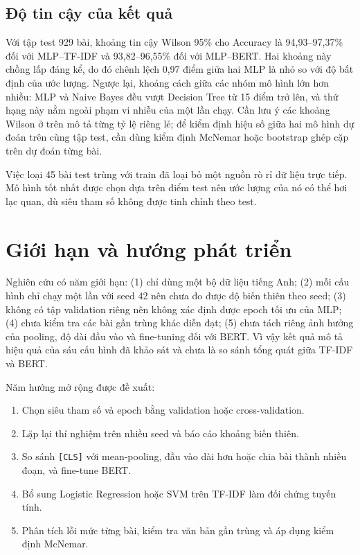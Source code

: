 \documentclass[conference,a4paper]{IEEEtran}
\begin{document}
\subsection{Độ tin cậy của kết quả}

Với tập test 929 bài, khoảng tin cậy Wilson 95\% cho Accuracy là 94,93--97,37\% đối với MLP--TF-IDF và 93,82--96,55\% đối với MLP--BERT. Hai khoảng này chồng lấp đáng kể, do đó chênh lệch 0,97 điểm giữa hai MLP là nhỏ so với độ bất định của ước lượng. Ngược lại, khoảng cách giữa các nhóm mô hình lớn hơn nhiều: MLP và Naive Bayes đều vượt Decision Tree từ 15 điểm trở lên, và thứ hạng này nằm ngoài phạm vi nhiễu của một lần chạy. Cần lưu ý các khoảng Wilson ở trên mô tả từng tỷ lệ riêng lẻ; để kiểm định hiệu số giữa hai mô hình dự đoán trên cùng tập test, cần dùng kiểm định McNemar hoặc bootstrap ghép cặp trên dự đoán từng bài.

Việc loại 45 bài test trùng với train đã loại bỏ một nguồn rò rỉ dữ liệu trực tiếp. Mô hình tốt nhất được chọn dựa trên điểm test nên ước lượng của nó có thể hơi lạc quan, dù siêu tham số không được tinh chỉnh theo test.

\section{Giới hạn và hướng phát triển}

Nghiên cứu có năm giới hạn: (1) chỉ dùng một bộ dữ liệu tiếng Anh; (2) mỗi cấu hình chỉ chạy một lần với seed 42 nên chưa đo được độ biến thiên theo seed; (3) không có tập validation riêng nên không xác định được epoch tối ưu của MLP; (4) chưa kiểm tra các bài gần trùng khác diễn đạt; (5) chưa tách riêng ảnh hưởng của pooling, độ dài đầu vào và fine-tuning đối với BERT. Vì vậy kết quả mô tả hiệu quả của sáu cấu hình đã khảo sát và chưa là so sánh tổng quát giữa TF-IDF và BERT.

Năm hướng mở rộng được đề xuất:
\begin{enumerate}[leftmargin=*]
    \item Chọn siêu tham số và epoch bằng validation hoặc cross-validation.
    \item Lặp lại thí nghiệm trên nhiều seed và báo cáo khoảng biến thiên.
    \item So sánh \texttt{[CLS]} với mean-pooling, đầu vào dài hơn hoặc chia bài thành nhiều đoạn, và fine-tune BERT.
    \item Bổ sung Logistic Regression hoặc SVM trên TF-IDF làm đối chứng tuyến tính.
    \item Phân tích lỗi mức từng bài, kiểm tra văn bản gần trùng và áp dụng kiểm định McNemar.
\end{enumerate}
\end{document}
